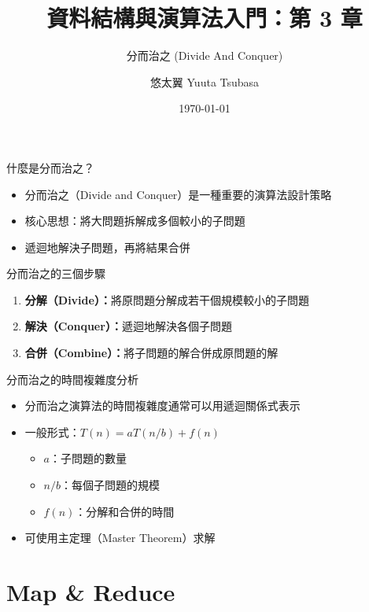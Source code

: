 \documentclass{beamer}
\begin{document}
\title{資料結構與演算法入門：第 3 章}
\subtitle{分而治之 (Divide And Conquer)}
\author{悠太翼 Yuuta Tsubasa}
\date{\today}

\frame{\titlepage}

\begin{frame}{什麼是分而治之？}
\begin{itemize}
    \item 分而治之（Divide and Conquer）是一種重要的演算法設計策略
    \item 核心思想：將大問題拆解成多個較小的子問題
    \item 遞迴地解決子問題，再將結果合併
\end{itemize}

\vspace{1em}
\begin{block}{分而治之的三個步驟}
\begin{enumerate}
    \item \textbf{分解（Divide）：}將原問題分解成若干個規模較小的子問題
    \item \textbf{解決（Conquer）：}遞迴地解決各個子問題
    \item \textbf{合併（Combine）：}將子問題的解合併成原問題的解
\end{enumerate}
\end{block}
\end{frame}

\begin{frame}{分而治之的時間複雜度分析}
\begin{itemize}
    \item 分而治之演算法的時間複雜度通常可以用遞迴關係式表示
    \item 一般形式：$T(n) = aT(n/b) + f(n)$
    \begin{itemize}
        \item $a$：子問題的數量
        \item $n/b$：每個子問題的規模
        \item $f(n)$：分解和合併的時間
    \end{itemize}
    \item 可使用主定理（Master Theorem）求解
\end{itemize}
\end{frame}

\section{Map \& Reduce}
\end{document}
